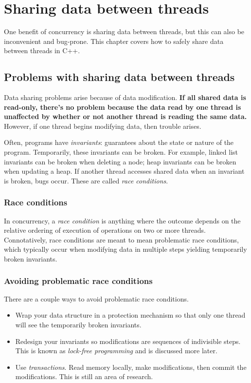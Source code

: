 \section{Sharing data between threads}
One benefit of concurrency is sharing data between threads, but this can also be inconvenient and bug-prone. This chapter covers how to safely share data between threads in C++.

\subsection{Problems with sharing data between threads}
Data sharing problems arise because of data modification. \textbf{If all shared data is read-only, there's no problem because the data read by one thread is unaffected by whether or not another thread is reading the same data.} However, if one thread begins modifying data, then trouble arises.

Often, programs have \emph{invariants}: guarantees about the state or nature of the program. Temporarily, these invariants can be broken. For example, linked list invariants can be broken when deleting a node; heap invariants can be broken when updating a heap. If another thread accesses shared data when an invariant is broken, bugs occur. These are called \emph{race conditions}.

\subsubsection{Race conditions}
In concurrency, a \emph{race condition} is anything where the outcome depends on the relative ordering of execution of operations on two or more threads. Connotatively, race conditions are meant to mean problematic race conditions, which typically occur when modifying data in multiple steps yielding temporarily broken invariants.

\subsubsection{Avoiding problematic race conditions}
There are a couple ways to avoid problematic race conditions.
\begin{itemize}
  \item Wrap your data structure in a protection mechanism so that only one thread will see the temporarily broken invariants.
  \item Redesign your invariants so modifications are sequences of indivisible steps. This is known as \emph{lock-free programming} and is discussed more later.
  \item Use \emph{transactions}. Read memory locally, make modifications, then commit the modifications. This is still an area of research.
\end{itemize}

